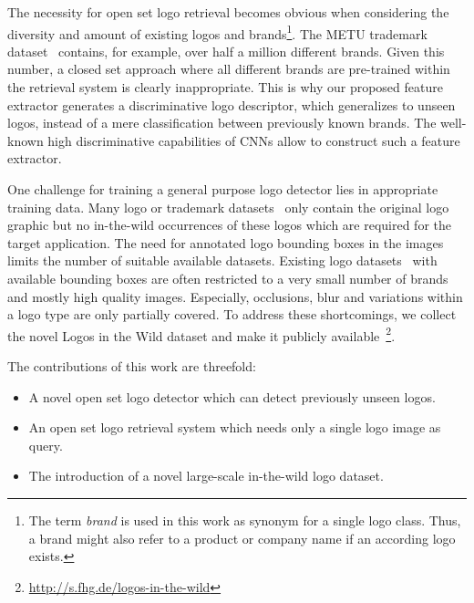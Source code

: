 \documentclass[a4paper,twoside]{article}
\begin{document}

The necessity for open set logo retrieval becomes obvious when considering the diversity and amount of existing logos and brands\footnote{The term \textit{brand} is used in this work as synonym for a single logo class. Thus, a brand might also refer to a product or company name if an according logo exists.}. The METU trademark dataset~\cite{tursun2017} contains, for example, over half a million different brands. Given this number, a closed set approach where all different brands are pre-trained within the retrieval system is clearly inappropriate.
This is why our proposed feature extractor generates a discriminative logo descriptor, which generalizes to unseen logos, instead of a mere classification between previously known brands. The well-known high discriminative capabilities of \acp{CNN} allow to construct such a feature extractor.

One challenge for training a general purpose logo detector lies in appropriate training data. Many logo or trademark datasets~\cite{eakins1998,hoi2015,tursun2017} only contain the original logo graphic but no in-the-wild occurrences of these logos which are required for the target application. The need for annotated logo bounding boxes in the images limits the number of suitable available datasets. Existing logo datasets~\cite{joly2009,kalantidis2011,romberg2011,letessier2012,bianco2015,su2016,bianco2017} with available bounding boxes are often restricted to a very small number of brands and mostly high quality images. Especially, occlusions, blur and variations within a logo type are only partially covered.
To address these shortcomings, we collect the novel Logos in the Wild dataset and make it publicly available~\footnote{\url{http://s.fhg.de/logos-in-the-wild}}.

The contributions of this work are threefold:
\begin{itemize}
\item A novel open set logo detector which can detect previously unseen logos.
\item An open set logo retrieval system which needs only a single logo image as query.
\item The introduction of a novel large-scale in-the-wild logo dataset.
\end{itemize}
\end{document}
